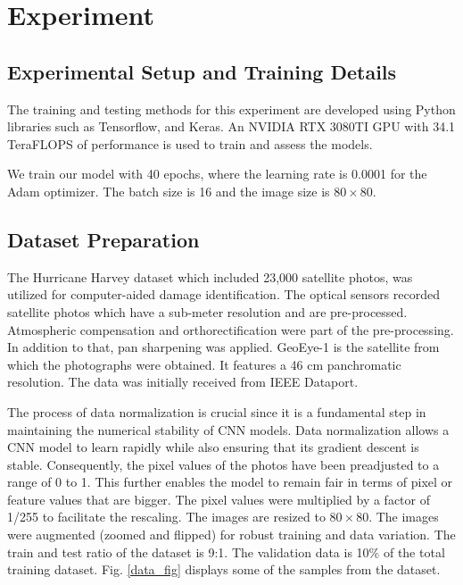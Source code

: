 \documentclass[conference]{IEEEtran}
\begin{document}
\section{Experiment}
\label{results}

\subsection{Experimental Setup and Training Details}
The training and testing methods for this experiment are developed using Python libraries such as Tensorflow, and Keras. An NVIDIA RTX 3080TI GPU with 34.1 TeraFLOPS of performance is used to train and assess the models.

We train our model with 40 epochs, where the learning rate is 0.0001 for the Adam optimizer. The batch size is 16 and the image size is $80 \times 80$. 




\subsection{Dataset Preparation}

The Hurricane Harvey dataset \cite{cao_building_2020,sdad-1e56-18} which included 23,000 satellite photos, was utilized for computer-aided damage identification. The optical sensors recorded satellite photos which have a sub-meter resolution and are pre-processed. Atmospheric compensation and orthorectification were part of the pre-processing. In addition to that, pan sharpening was applied. GeoEye-1 is the satellite from which the photographs were obtained. It features a 46 cm panchromatic resolution. The data was initially received from IEEE Dataport.

The process of data normalization is crucial since it is a fundamental step in maintaining the numerical stability of CNN models. Data normalization allows a CNN model to learn rapidly while also ensuring that its gradient descent is stable. Consequently, the pixel values of the photos have been preadjusted to a range of 0 to 1. This further enables the model to remain fair in terms of pixel or feature values that are bigger. The pixel values were multiplied by a factor of 1/255 to facilitate the rescaling. The images are resized to $80 \times 80$. The images were augmented (zoomed and flipped) for robust training and data variation. The train and test ratio of the dataset is 9:1. The validation data is 10\% of the total training dataset. Fig. \ref{data_fig} displays some of the samples from the dataset.
\end{document}
